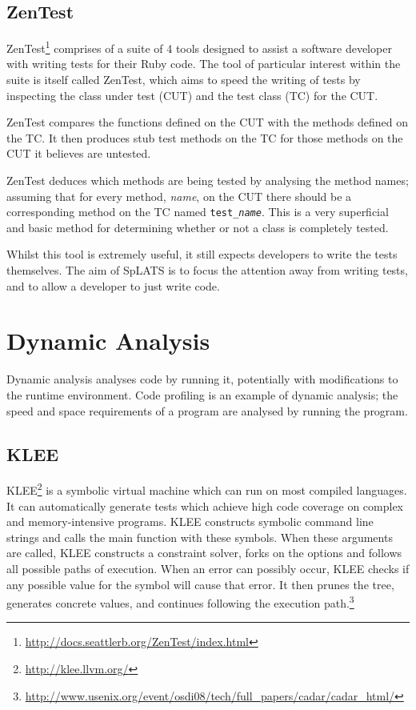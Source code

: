   \subsection{ZenTest}
    ZenTest\footnote{\url{http://docs.seattlerb.org/ZenTest/index.html}}
comprises of a suite of 4 tools designed to assist a software developer with
writing tests for their Ruby code. The tool of particular interest within the suite is itself called ZenTest,
which aims to speed the writing of tests by inspecting the class under test (CUT)
and the test class (TC) for the CUT.

    ZenTest compares the functions defined on the CUT with the methods defined
on the TC. It then produces stub test methods on the TC for those methods on the
CUT it believes are untested.

ZenTest deduces which methods are being tested by analysing the method names; assuming that for every method, \emph{name}, on the CUT there should be a corresponding method on the TC named \texttt{test\_\emph{name}}. This is a very superficial and basic method for determining whether or not a class is completely tested.

    Whilst this tool is extremely useful, it still expects developers to write
the tests themselves. The aim of SpLATS is to focus the attention away from
writing tests, and to allow a developer to just write code.
  
\section{Dynamic Analysis} 

  Dynamic analysis analyses code by running it, potentially with modifications
  to the runtime environment. Code profiling is an example of dynamic analysis;
  the speed and space requirements of a program are analysed by running the
  program.
  
  \subsection{KLEE}
  KLEE\footnote{\url{http://klee.llvm.org/}} is a symbolic virtual machine which can run on most compiled languages. It can automatically generate tests which achieve high code coverage on complex and memory-intensive programs. KLEE constructs symbolic command line strings and calls the main function with these symbols. When these arguments are called, KLEE constructs a constraint solver, forks on the options and follows all possible paths of execution. When an error can possibly occur, KLEE checks if any possible value for the symbol will cause that error. It then prunes the tree, generates concrete values, and continues following the execution path.\footnote{\url{http://www.usenix.org/event/osdi08/tech/full_papers/cadar/cadar_html/}}


